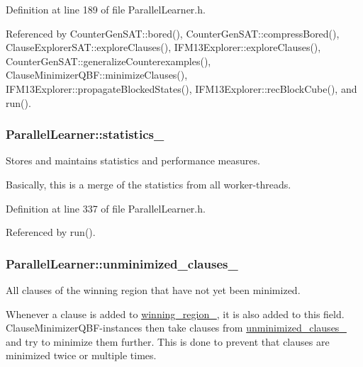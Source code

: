 Definition at line 189 of file Parallel\-Learner.\-h.



Referenced by Counter\-Gen\-S\-A\-T\-::bored(), Counter\-Gen\-S\-A\-T\-::compress\-Bored(), Clause\-Explorer\-S\-A\-T\-::explore\-Clauses(), I\-F\-M13\-Explorer\-::explore\-Clauses(), Counter\-Gen\-S\-A\-T\-::generalize\-Counterexamples(), Clause\-Minimizer\-Q\-B\-F\-::minimize\-Clauses(), I\-F\-M13\-Explorer\-::propagate\-Blocked\-States(), I\-F\-M13\-Explorer\-::rec\-Block\-Cube(), and run().

\hypertarget{classParallelLearner_abfb2e28ec1a0f8775d3f14f75415a8bd}{
\subsubsection[{statistics\-\_\-}]{ Parallel\-Learner\-::statistics\-\_\-\hspace{0.3cm}{\ttfamily [protected]}}}\label{classParallelLearner_abfb2e28ec1a0f8775d3f14f75415a8bd}


Stores and maintains statistics and performance measures. 

Basically, this is a merge of the statistics from all worker-\/threads. 

Definition at line 337 of file Parallel\-Learner.\-h.



Referenced by run().

\hypertarget{classParallelLearner_aba6b363071d9a39d7b368cec5b629c25}{
\subsubsection[{unminimized\-\_\-clauses\-\_\-}]{ Parallel\-Learner\-::unminimized\-\_\-clauses\-\_\-}}\label{classParallelLearner_aba6b363071d9a39d7b368cec5b629c25}


All clauses of the winning region that have not yet been minimized. 

Whenever a clause is added to \hyperlink{classParallelLearner_a7c8383543ff98d7a0356a237756dcdd6}{winning\-\_\-region\-\_\-}, it is also added to this field. Clause\-Minimizer\-Q\-B\-F-\/instances then take clauses from \hyperlink{classParallelLearner_aba6b363071d9a39d7b368cec5b629c25}{unminimized\-\_\-clauses\-\_\-} and try to minimize them further. This is done to prevent that clauses are minimized twice or multiple times. 

